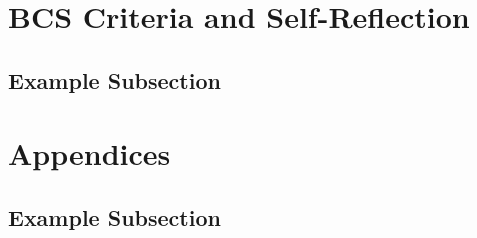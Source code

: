 \documentclass[
  a4paper,
  10pt,
]{article}
\begin{document}
\blindtext[3]

\section{BCS Criteria and Self-Reflection}
\blindtext[2]

\subsection{Example Subsection}
\blindtext[2]





\section{Appendices}
\subsection{Example Subsection}
\blindtext[1]
\end{document}
